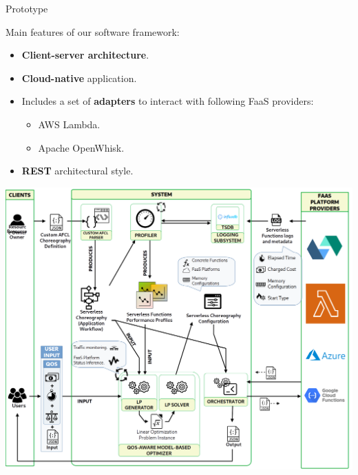 \documentclass[13.5pt]{beamer}
\newcommand{\B}[1]{\textcolor{TorVergataColor}{\textbf{#1}}}
\begin{document}
\begin{frame}{Prototype}
	
 	Main features of our software framework:
	\vspace{\baselineskip}
	\begin{itemize}
		\item \B{Client-server architecture}.
		\item \B{Cloud-native} application.
		\item Includes a set of \B{adapters} to interact with following FaaS providers:
		\begin{itemize}
			\item AWS Lambda.
			\item Apache OpenWhisk.
		\end{itemize}
		\item \B{REST} architectural style.
	\end{itemize}
	
\end{frame} 
\begin{frame}

\begin{center}
	\includegraphics[width=\textwidth,height=0.95\textheight]{../Images/SystemForSlide.png}
\end{center}


\end{frame} 
\end{document}
